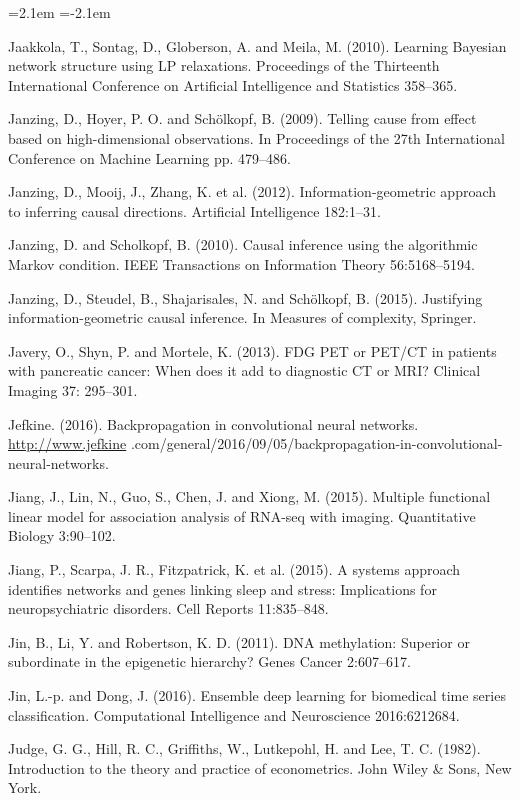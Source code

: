 \begin{list}{}{\leftmargin=2.1em  
  \itemindent=-2.1em \parsep=0pt \itemsep=2pt \topsep=0pt}
\item Jaakkola, T., Sontag, D., Globerson, A. and Meila, M. (2010). Learning Bayesian network structure using LP relaxations. Proceedings of the Thirteenth International Conference on Artificial Intelligence and Statistics 358--365.
\item Janzing, D., Hoyer, P. O. and Schölkopf, B. (2009). Telling cause from effect based on high-dimensional observations. In Proceedings of the 27th International Conference on Machine Learning pp. 479--486.
\item Janzing, D., Mooij, J., Zhang, K. et al. (2012). Information-geometric approach to inferring causal directions. Artificial Intelligence 182:1--31.
\item Janzing, D. and Scholkopf, B. (2010). Causal inference using the algorithmic Markov condition. IEEE Transactions on Information Theory 56:5168--5194.
\item Janzing, D., Steudel, B., Shajarisales, N. and Schölkopf, B. (2015). Justifying information-geometric causal inference. In Measures of complexity, Springer.
\item Javery, O., Shyn, P. and Mortele, K. (2013). FDG PET or PET/CT in patients with pancreatic cancer: When does it add to diagnostic CT or MRI? Clinical Imaging 37: 295--301.
\item Jefkine. (2016). Backpropagation in convolutional neural networks. \url{http://www.jefkine} .com/general/2016/09/05/backpropagation-in-convolutional-neural-networks.
\item Jiang, J., Lin, N., Guo, S., Chen, J. and Xiong, M. (2015). Multiple functional linear model for association analysis of RNA-seq with imaging. Quantitative Biology 3:90--102.
\item Jiang, P., Scarpa, J. R., Fitzpatrick, K. et al. (2015). A systems approach identifies networks and genes linking sleep and stress: Implications for neuropsychiatric disorders. Cell Reports 11:835--848.
\item Jin, B., Li, Y. and Robertson, K. D. (2011). DNA methylation: Superior or subordinate in the epigenetic hierarchy? Genes Cancer 2:607--617.
\item Jin, L.-p. and Dong, J. (2016). Ensemble deep learning for biomedical time series classification. Computational Intelligence and Neuroscience 2016:6212684.
\item Judge, G. G., Hill, R. C., Griffiths, W., Lutkepohl, H. and Lee, T. C. (1982). Introduction to the theory and practice of econometrics. John Wiley \& Sons, New York.

\end{list}
